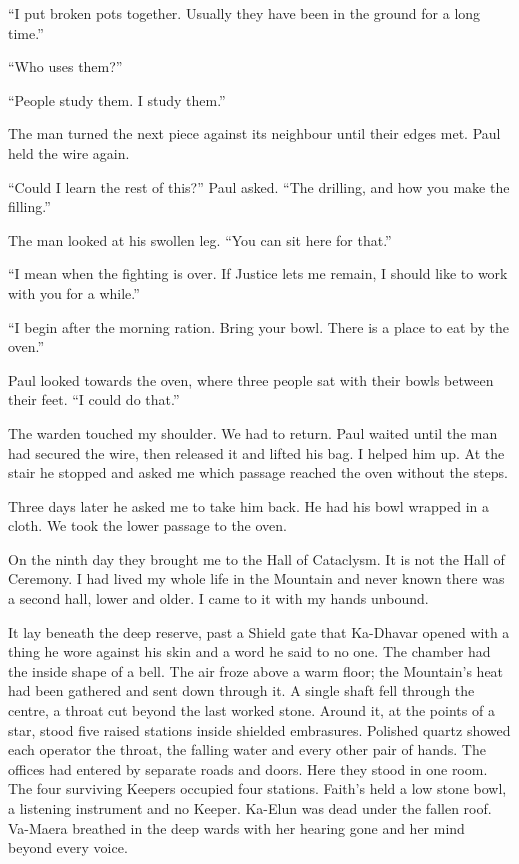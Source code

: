 ``I put broken pots together. Usually they have been in the ground for a long time.''\par

``Who uses them?''\par

``People study them. I study them.''\par

The man turned the next piece against its neighbour until their edges met. Paul held the wire again.\par

``Could I learn the rest of this?'' Paul asked. ``The drilling, and how you make the filling.''\par

The man looked at his swollen leg. ``You can sit here for that.''\par

``I mean when the fighting is over. If Justice lets me remain, I should like to work with you for a while.''\par

``I begin after the morning ration. Bring your bowl. There is a place to eat by the oven.''\par

Paul looked towards the oven, where three people sat with their bowls between their feet. ``I could do that.''\par

The warden touched my shoulder. We had to return. Paul waited until the man had secured the wire, then released it and lifted his bag. I helped him up. At the stair he stopped and asked me which passage reached the oven without the steps.\par

Three days later he asked me to take him back. He had his bowl wrapped in a cloth. We took the lower passage to the oven.\par

\ornament

On the ninth day they brought me to the Hall of Cataclysm. It is not the Hall of Ceremony. I had lived my whole life in the Mountain and never known there was a second hall, lower and older. I came to it with my hands unbound.\par

It lay beneath the deep reserve, past a Shield gate that Ka-Dhavar opened with a thing he wore against his skin and a word he said to no one. The chamber had the inside shape of a bell. The air froze above a warm floor; the Mountain's heat had been gathered and sent down through it. A single shaft fell through the centre, a throat cut beyond the last worked stone. Around it, at the points of a star, stood five raised stations inside shielded embrasures. Polished quartz showed each operator the throat, the falling water and every other pair of hands. The offices had entered by separate roads and doors. Here they stood in one room. The four surviving Keepers occupied four stations. Faith's held a low stone bowl, a listening instrument and no Keeper. Ka-Elun was dead under the fallen roof. Va-Maera breathed in the deep wards with her hearing gone and her mind beyond every voice.\par

